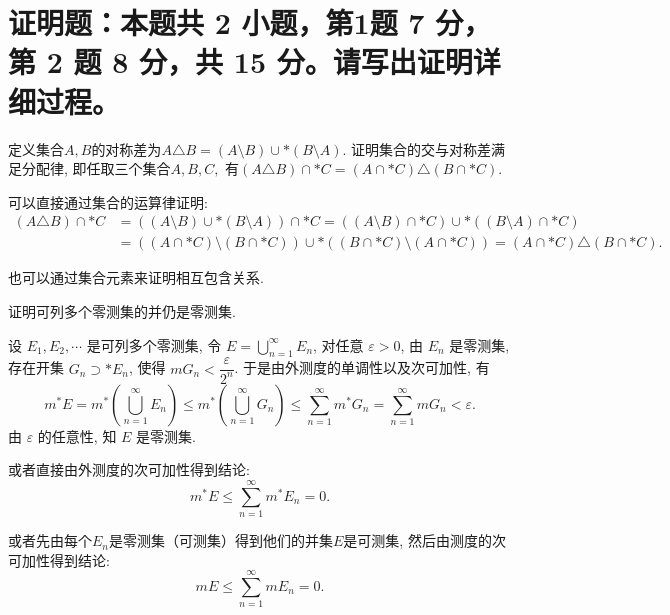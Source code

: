 \fi


\section{%
  证明题：本题共 2 小题，第1题 7 分，第 2 题 8 分，共 15 分。请写出证明详细过程。
}


\begin{question}[points = 7]
定义集合$A, B$的对称差为$A \triangle B = (A \setminus B) \cup* (B \setminus A).$ 证明集合的交与对称差满足分配律, 即任取三个集合$A, B, C,$ 有$(A \triangle B) \cap* C = (A \cap* C) \triangle (B \cap* C).$
\end{question}

\begin{solution}
可以直接通过集合的运算律证明:
\[\begin{aligned}
(A \triangle B) \cap* C & = ((A \setminus B) \cup* (B \setminus A)) \cap* C = ((A \setminus B) \cap* C) \cup* ((B \setminus A) \cap* C) \\
& = ((A \cap* C) \setminus (B \cap* C)) \cup* ((B \cap* C) \setminus (A \cap* C)) = (A \cap* C) \triangle (B \cap* C).
\end{aligned}\]

也可以通过集合元素来证明相互包含关系.
\end{solution}

\begin{question}[points = 8]
证明可列多个零测集的并仍是零测集.
\end{question}

\begin{solution}
设 \(E_1, E_2, \cdots\) 是可列多个零测集, 令 \(E = \bigcup\limits_{n=1}^{\infty} E_n\), 对任意 \(\varepsilon > 0\), 由 \(E_n\) 是零测集, 存在开集 \(G_n \supset* E_n\), 使得 \(m G_n < \dfrac{\varepsilon}{2^n}\). 于是由外测度的单调性以及次可加性, 有
\[m^* E = m^* \left( \bigcup\limits_{n=1}^{\infty} E_n \right) \leqslant m^* \left( \bigcup\limits_{n=1}^{\infty} G_n \right) \leqslant \sum\limits_{n=1}^{\infty} m^* G_n = \sum\limits_{n=1}^{\infty} m G_n < \varepsilon.\]
由 \(\varepsilon\) 的任意性, 知 \(E\) 是零测集.

或者直接由外测度的次可加性得到结论:
\[m^* E \leqslant \sum\limits_{n=1}^{\infty} m^* E_n = 0.\]

或者先由每个\(E_n\)是零测集（可测集）得到他们的并集\(E\)是可测集, 然后由测度的次可加性得到结论:
\[m E \leqslant \sum\limits_{n=1}^{\infty} m E_n = 0.\]
\end{solution}


